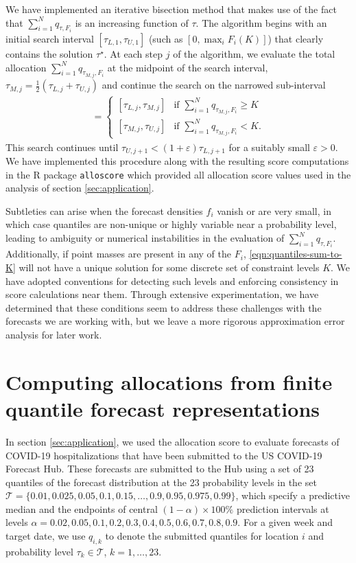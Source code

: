 \documentclass{article}\usepackage[]{graphicx}\usepackage[]{xcolor}
\begin{document}
We have implemented an iterative bisection method that makes use of the fact that $\sum_{i=1}^N q_{\tau,F_i}$ is an
increasing function of $\tau$. The algorithm begins with an initial search interval $[\tau_{L,1}, \tau_{U,1}]$ (such as
$[0,\max_{i}F_i(K)]$) that clearly contains the solution $\tau^{\star}$. At each step $j$ of the algorithm, we evaluate
the total allocation $\sum_{i=1}^N q_{\tau_{M,j},F_i}$ at the midpoint of the search interval,
$\tau_{M,j} = \frac{1}{2}(\tau_{L,j} + \tau_{U,j})$ and continue the search on the narrowed sub-interval
\begin{align}
[\tau_{L,j+1},\tau_{U,j+1}] =
\begin{cases}
[\tau_{L,j}, \tau_{M,j}] & \text{if } \sum_{i=1}^N q_{\tau_{M,j},F_i} \geq K \\
[\tau_{M,j}, \tau_{U,j}] & \text{if } \sum_{i=1}^N q_{\tau_{M,j},F_i} < K.
\end{cases} \nonumber
\end{align}
This search continues until $\tau_{U,j+1} < (1+\varepsilon)\tau_{L,j+1}$ for a suitably small $\varepsilon>0$. We have
implemented this procedure along with the resulting score computations in the R package \verb`alloscore`
\citep{gerding-alloscore} which provided all allocation score values used in the analysis of section
\ref{sec:application}.

Subtleties can arise when the forecast densities $f_i$ vanish or are very small, in which case quantiles are non-unique
or highly variable near a probability level, leading to ambiguity or numerical instabilities{} in the evaluation of
$\sum_{i=1}^N q_{\tau,F_i}$. Additionally, if point masses are present in any of the $F_i$,
\eqref{eqn:quantiles-sum-to-K} will not have a unique solution for some discrete set of constraint levels $K$. We have
adopted conventions for detecting such levels and enforcing consistency in score calculations near them. Through
extensive experimentation, we have determined that these conditions seem to address these challenges with the forecasts
we are working with, but we leave a more rigorous approximation error analysis for later work.

\section{Computing allocations from finite quantile forecast representations}
\label{sec:a:distfromq}

In section \ref{sec:application}, we used the allocation score to evaluate forecasts of COVID-19
hospitalizations that have been submitted to the US COVID-19 Forecast Hub. These forecasts are submitted to the Hub
using a set of 23 quantiles of the forecast distribution at the 23 probability levels in the set $\mathcal{T} = \{0.01,
0.025, 0.05, 0.1, 0.15, \ldots, \allowbreak 0.9, 0.95, 0.975, 0.99\}$, which specify a predictive median and the
endpoints of central $(1 - \alpha) \times 100\%$ prediction intervals at levels $\alpha = 0.02, 0.05, 0.1, 0.2,
\allowbreak 0.3, 0.4, 0.5, 0.6, \allowbreak 0.7, 0.8, 0.9$. For a given week and target date, we use $q_{i,k}$ to denote
the submitted quantiles for location $i$ and probability level $\tau_k \in \mathcal{T}$, $k = 1, \ldots, 23$.
\end{document}

